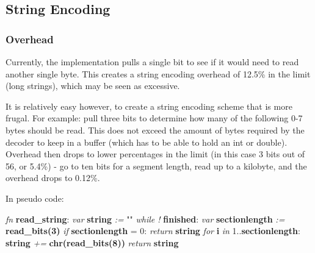 \subsection{String Encoding}

\subsubsection{Overhead}

Currently, the implementation pulls a single bit to see if it would need
to read another single byte. This creates a string encoding overhead of
12.5\% in the limit (long strings), which may be seen as excessive.

It is relatively easy however, to create a string encoding scheme that
is more frugal. For example: pull three bits to determine how many of the
following 0-7 bytes should be read. This does not exceed the amount of
bytes required by the decoder to keep in a buffer (which has to be
able to hold an int or double).
Overhead then drops to lower percentages in the limit
(in this case 3 bits out of 56, or 5.4\%) -  go to ten bits for a segment
length, read up to a kilobyte, and the overhead drops to 0.12\%.

In pseudo code:

\begin{changemargin}{-60mm}{0mm}
\begin{myquote}

\vbox{
\textit{fn} \textbf{read\_string}: \newline
\indent\hspace{.5cm} \textit{var} \textbf{string} \textit{:=} "" \newline
\indent\hspace{.5cm} \textit{while !} \textbf{finished}: \newline
\indent\hspace{1cm} \textit{var} \textbf{sectionlength} \textit{:=} \textbf{read\_bits(3)} \newline
\indent\hspace{1cm} \textit{if} \textbf{sectionlength} = 0: \newline
\indent\hspace{1.5cm} \textit{return} \textbf{string} \newline
\indent\hspace{1cm} \textit{for} \textbf{i} \textit{in} 1..\textbf{sectionlength}: \newline
\indent\hspace{1.5cm} \textbf{string} \textit{+=} \textbf{chr(read\_bits(8))} \newline
\indent\hspace{.5cm} \textit{return} \textbf{string} \newline
}

\end{myquote}
\end{changemargin}

